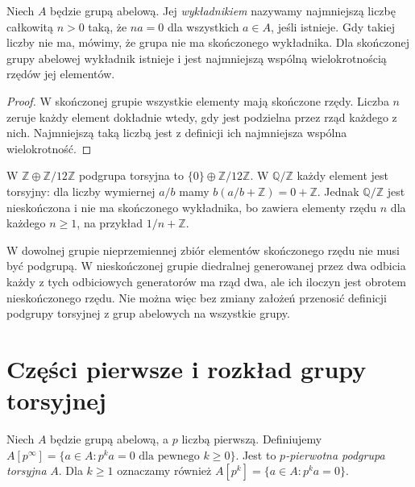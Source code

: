 \begin{definicja}
\label{aa:def:abelian-exponent}
Niech $A$ będzie grupą abelową. Jej \emph{wykładnikiem} nazywamy najmniejszą
liczbę całkowitą $n>0$ taką, że $na=0$ dla wszystkich
$a\in A$, jeśli istnieje. Gdy takiej liczby nie ma,
mówimy, że grupa nie ma skończonego wykładnika.
Dla skończonej grupy abelowej wykładnik istnieje i jest
najmniejszą wspólną wielokrotnością rzędów jej elementów.
\end{definicja}
\begin{proof}
W skończonej grupie wszystkie elementy mają skończone rzędy.
Liczba $n$ zeruje każdy element dokładnie wtedy, gdy jest
podzielna przez rząd każdego z nich. Najmniejszą taką
liczbą jest z definicji ich najmniejsza wspólna wielokrotność.
\end{proof}

\begin{przyklad}
\label{aa:prz:torsion-infinite}
W $\mathbb Z\oplus\mathbb Z/12\mathbb Z$ podgrupa torsyjna
to $\{0\}\oplus\mathbb Z/12\mathbb Z$.
W $\mathbb Q/\mathbb Z$ każdy element jest torsyjny:
dla liczby wymiernej $a/b$ mamy
$b(a/b+\mathbb Z)=0+\mathbb Z$.
Jednak $\mathbb Q/\mathbb Z$ jest nieskończona i nie ma
skończonego wykładnika, bo zawiera elementy rzędu $n$
dla każdego $n\ge1$, na przykład $1/n+\mathbb Z$.
\end{przyklad}

\begin{uwaga}
W dowolnej grupie nieprzemiennej zbiór elementów skończonego
rzędu nie musi być podgrupą. W nieskończonej grupie
diedralnej generowanej przez dwa odbicia każdy z tych
odbiciowych generatorów ma rząd dwa, ale ich iloczyn
jest obrotem nieskończonego rzędu. Nie można więc
bez zmiany założeń przenosić definicji podgrupy torsyjnej
z grup abelowych na wszystkie grupy.
\end{uwaga}

\section{Części pierwsze i rozkład grupy torsyjnej}
\begin{definicja}
\label{aa:def:abelian-primary}
Niech $A$ będzie grupą abelową, a $p$ liczbą pierwszą. Definiujemy
$A[p^\infty]=\{a\in A: p^k a=0\text{ dla pewnego }k\ge0\}$.
Jest to \emph{$p$-pierwotna podgrupa torsyjna} $A$.
Dla $k\ge1$ oznaczamy również
$A[p^k]=\{a\in A:p^k a=0\}$.
\end{definicja}

